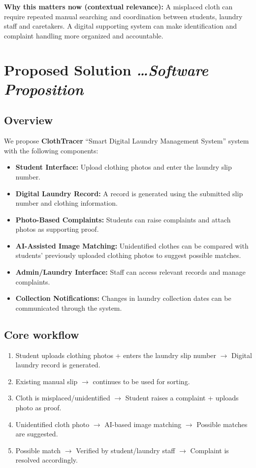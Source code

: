 \documentclass[11pt,a4paper]{article}
\newcommand{\BvrHint}[1]{%
  {\normalfont\normalsize\itshape\hfill #1}}
\begin{document}
\textbf{Why this matters now (contextual relevance):} A misplaced cloth can require repeated manual searching and coordination between students, laundry staff and caretakers. A digital supporting system can make identification and complaint handling more organized and accountable.

\section{Proposed Solution %
\BvrHint{\ldots Software Proposition}}
\subsection{Overview}
We propose \textbf{ClothTracer} ``Smart Digital Laundry Management System'' system with the following components:
\begin{itemize}[leftmargin=0.7cm]
    \item \textbf{Student Interface:} Upload clothing photos and enter the laundry slip number.
    \item \textbf{Digital Laundry Record:} A record is generated using the submitted slip number and clothing information.
    \item \textbf{Photo-Based Complaints:} Students can raise complaints and attach photos as supporting proof.
    \item \textbf{AI-Assisted Image Matching:} Unidentified clothes can be compared with students' previously uploaded clothing photos to suggest possible matches.
    \item \textbf{Admin/Laundry Interface:} Staff can access relevant records and manage complaints.
     \item \textbf{Collection Notifications:} Changes in laundry collection dates can be communicated through the system.
\end{itemize}

\subsection{Core workflow}

\begin{enumerate}[leftmargin=0.7cm]
    \item Student uploads clothing photos + enters the laundry slip number
    $\rightarrow$ Digital laundry record is generated.

    \item Existing manual slip
    $\rightarrow$ continues to be used for sorting.

    \item Cloth is misplaced/unidentified
    $\rightarrow$ Student raises a complaint + uploads photo as proof.

    \item Unidentified cloth photo
    $\rightarrow$ AI-based image matching
    $\rightarrow$ Possible matches are suggested.

    \item Possible match
    $\rightarrow$ Verified by student/laundry staff
    $\rightarrow$ Complaint is resolved accordingly.
\end{enumerate}
\end{document}
